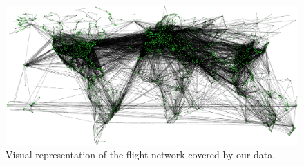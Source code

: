 \documentclass{Resources/netsci-project}
\begin{document}
\begin{figure}[!ht]
    \centering
    \includegraphics[width=\linewidth]{Figures/final_network.pdf}
    \caption{Visual representation of the flight network covered by our data.}
    \label{fig:final_network}
\end{figure}

\end{document}
